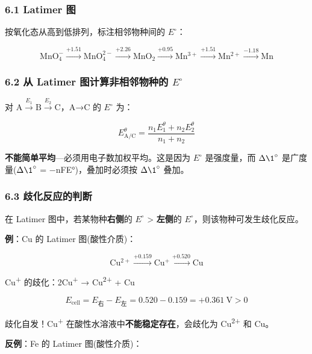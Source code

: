 \subsubsection{6.1 Latimer 图}\label{latimer-ux56fe}

按氧化态从高到低排列，标注相邻物种间的 \(E^{\circ}\)：

\[
\mathrm{MnO_4^-} \xrightarrow{+1.51} \mathrm{MnO_4^{2-}} \xrightarrow{+2.26} \mathrm{MnO_2} \xrightarrow{+0.95} \mathrm{Mn^{3+}} \xrightarrow{+1.51} \mathrm{Mn^{2+}} \xrightarrow{-1.18} \mathrm{Mn}
\]

\subsubsection{\texorpdfstring{6.2 从 Latimer 图计算非相邻物种的 \(E^{\circ}\)}{6.2 从 Latimer 图计算非相邻物种的 E\^{}\{\textbackslash circ\}}}\label{ux4ece-latimer-ux56feux8ba1ux7b97ux975eux76f8ux90bbux7269ux79cdux7684-ecirc}

对 \(\mathrm{A} \xrightarrow{E_1} \mathrm{B} \xrightarrow{E_2} \mathrm{C}\)，A→C 的 \(E^{\circ}\) 为：

\[
E^\theta_{\mathrm{A/C}} = \frac{n_1 E_1^\theta + n_2 E_2^\theta}{n_1 + n_2}
\]

\textbf{不能简单平均}---必须用电子数加权平均。这是因为 \(E^{\circ}\) 是强度量，而 \(\Delta \1^{\circ}\) 是广度量(\(\Delta \1^{\circ}\) = −nFE°)，叠加时必须按 \(\Delta \1^{\circ}\) 叠加。

\subsubsection{6.3 歧化反应的判断}\label{ux6b67ux5316ux53cdux5e94ux7684ux5224ux65ad}

在 Latimer 图中，若某物种\textbf{右侧}的 \(E^{\circ}\) \textgreater{} \textbf{左侧}的 \(E^{\circ}\)，则该物种可发生歧化反应。

\textbf{例}：Cu 的 Latimer 图(酸性介质)：

\[\mathrm{Cu^{2+}} \xrightarrow{+0.159} \mathrm{Cu^+} \xrightarrow{+0.520} \mathrm{Cu}\]

Cu\textsuperscript{+} 的歧化：2Cu\textsuperscript{+} → Cu\textsuperscript{2+} + Cu

\[E_{\text{cell}} = E_{\text{右}} - E_{\text{左}} = 0.520 - 0.159 = +0.361\ \mathrm{V} > 0\]

歧化自发！Cu\textsuperscript{+} 在酸性水溶液中\textbf{不能稳定存在}，会歧化为 Cu\textsuperscript{2+} 和 Cu。

\textbf{反例}：Fe 的 Latimer 图(酸性介质)：

